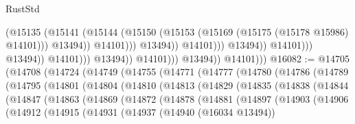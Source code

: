 \begin{lexlean}{RustStd}
\begin{coremodule}
                                                        (@15135
                                                          (@15141
                                                            (@15144
                                                              (@15150
                                                                (@15153
                                                                  (@15169
                                                                    (@15175
                                                                      (@15178 @15986)
                                                                      @14101)))
                                                                @13494))
                                                            @14101)))
                                                      @13494))
                                                  @14101)))
                                            @13494))
                                        @14101)))
                                  @13494))
                              @14101)))
                        @13494))
                    @14101)))
              @13494))
          @14101)))
@16082 := @14705
    (@14708
      (@14724
        (@14749
          (@14755
            (@14771
              (@14777
                (@14780
                  (@14786
                    (@14789
                      (@14795
                        (@14801
                          (@14804
                            (@14810
                              (@14813
                                (@14829
                                  (@14835
                                    (@14838
                                      (@14844
                                        (@14847
                                          (@14863
                                            (@14869
                                              (@14872
                                                (@14878
                                                  (@14881
                                                    (@14897
                                                      (@14903
                                                        (@14906
                                                          (@14912
                                                            (@14915
                                                              (@14931
                                                                (@14937
                                                                  (@14940 (@16034 @13494))

\end{coremodule}
\end{lexlean}
